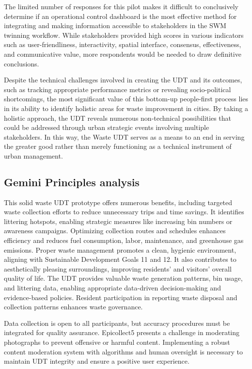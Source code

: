 \documentclass[authoryear,preprint,review,doubleblind, 12pt]{elsarticle}
\begin{document}
    The limited number of responses for this pilot makes it difficult to conclusively determine if an operational control dashboard is the most effective method for integrating and making information accessible to stakeholders in the SWM twinning workflow. While stakeholders provided high scores in various indicators such as user-friendliness, interactivity, spatial interface, consensus, effectiveness, and communicative value, more respondents would be needed to draw definitive conclusions.

     Despite the technical challenges involved in creating the UDT and its outcomes, such as tracking appropriate performance metrics or revealing socio-political shortcomings, the most significant value of this bottom-up people-first process lies in its ability to identify holistic areas for waste improvement in cities. By taking a holistic approach, the UDT reveals numerous non-technical possibilities that could be addressed through urban strategic events involving multiple stakeholders. In this way, the Waste UDT serves as a means to an end in serving the greater good rather than merely functioning as a technical instrument of urban management.

\subsection{Gemini Principles analysis} \label{subsec:Gemini}
    This solid waste UDT prototype offers numerous benefits, including targeted waste collection efforts to reduce unnecessary trips and time savings. It identifies littering hotspots, enabling strategic measures like increasing bin numbers or awareness campaigns. Optimizing collection routes and schedules enhances efficiency and reduces fuel consumption, labor, maintenance, and greenhouse gas emissions. Proper waste management promotes a clean, hygienic environment, aligning with Sustainable Development Goals 11 and 12. It also contributes to aesthetically pleasing surroundings, improving residents' and visitors' overall quality of life. The UDT provides valuable waste generation patterns, bin usage, and littering data, enabling appropriate data-driven decision-making and evidence-based policies. Resident participation in reporting waste disposal and collection patterns enhances waste governance.

    Data collection is open to all participants, but accuracy procedures must be integrated for quality assurance. Epicollect5 presents a challenge in moderating photographs to prevent offensive or harmful content. Implementing a robust content moderation system with algorithms and human oversight is necessary to maintain UDT integrity and ensure a positive user experience.
 
\end{document}
